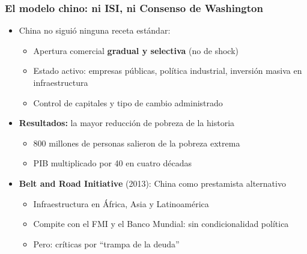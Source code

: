 \begin{frame}
\frametitle{El modelo chino: ni ISI, ni Consenso de Washington}
\centering

\begin{itemize}
  \item China no sigui\'{o} ninguna receta est\'{a}ndar:
  \begin{itemize}
    \item Apertura comercial \textbf{gradual y selectiva} (no de shock)
    \item Estado activo: empresas p\'{u}blicas, pol\'{i}tica industrial, inversi\'{o}n masiva en infraestructura
    \item Control de capitales y tipo de cambio administrado
  \end{itemize}
  \vspace{8pt}
  \item<2-> \textbf{Resultados:} la mayor reducci\'{o}n de pobreza de la historia
  \begin{itemize}
    \item 800 millones de personas salieron de la pobreza extrema
    \item PIB multiplicado por 40 en cuatro d\'{e}cadas
  \end{itemize}
  \vspace{8pt}
  \item<3-> \textbf{Belt and Road Initiative} (2013): China como prestamista alternativo
  \begin{itemize}
    \item Infraestructura en \'{A}frica, Asia y Latinoam\'{e}rica
    \item Compite con el FMI y el Banco Mundial: \alert{sin condicionalidad pol\'{i}tica}
    \item Pero: cr\'{i}ticas por ``trampa de la deuda''
  \end{itemize}
\end{itemize}

\end{frame}
